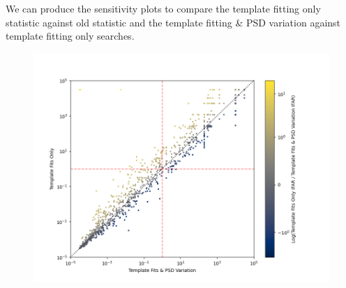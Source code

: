 We can produce the sensitivity plots to compare the template fitting only statistic against old statistic and the template fitting \& PSD variation against template fitting only searches.
%
\begin{figure}
       \centering
    \includegraphics[width=1.2\textwidth]{images/pycbclive/fits_psdvar_comparison_ifar_vs_ifar_diff.png}
    \caption{}
    \label{fig:pycbclive-ifar-ifar-fits-psdvar}
\end{figure}
%
